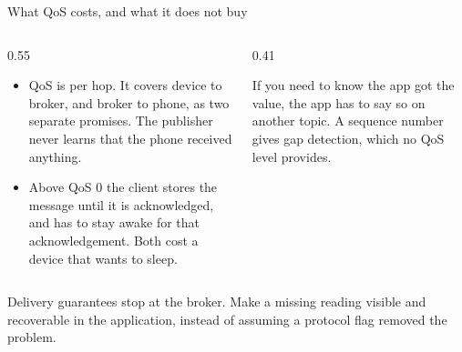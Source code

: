 \documentclass[10pt,aspectratio=169,t]{beamer}
\begin{document}
\begin{frame}[embedded,eyebrow=MQTT]{What QoS costs, and what it does not buy}
  \vskip 2mm
  \begin{columns}[T]
    \begin{column}{0.55\textwidth}
      \begin{itemize}
        \item QoS is per hop. It covers device to broker, and broker to phone, as two separate promises. The publisher never learns that the phone received anything.
        \item Above QoS 0 the client stores the message until it is acknowledged, and has to stay awake for that acknowledgement. Both cost a device that wants to sleep.
      \end{itemize}
    \end{column}
    \begin{column}{0.41\textwidth}
      \begin{hint}
        If you need to know the app got the value, the app has to say so on another topic. A sequence number gives gap detection, which no QoS level provides.
      \end{hint}
    \end{column}
  \end{columns}
  \begin{takeaway}{Delivery guarantees stop at the broker.}
    Make a missing reading visible and recoverable in the application, instead of assuming a protocol flag removed the problem.
  \end{takeaway}
\end{frame}
\end{document}
